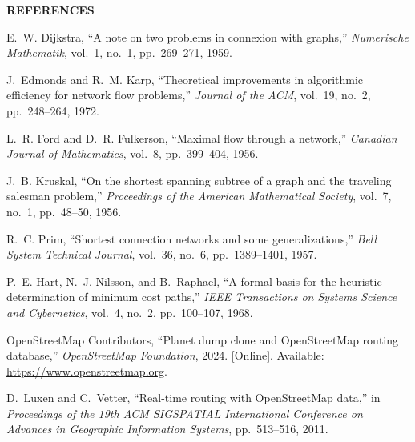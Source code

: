 \documentclass[12pt,oneside]{report}
\begin{document}
\clearpage

\thispagestyle{plain}
\begin{center}
\vspace*{0.15in}
{\LARGE\bfseries REFERENCES}
\end{center}
\vspace{0.25in}

\begin{enumerate}[label={[\arabic*]},leftmargin=2.5em,itemsep=8pt]
    \item E.~W. Dijkstra, ``A note on two problems in connexion with graphs,'' \emph{Numerische Mathematik}, vol.~1, no.~1, pp.~269--271, 1959.
    
    \item J.~Edmonds and R.~M. Karp, ``Theoretical improvements in algorithmic efficiency for network flow problems,'' \emph{Journal of the ACM}, vol.~19, no.~2, pp.~248--264, 1972.
    
    \item L.~R. Ford and D.~R. Fulkerson, ``Maximal flow through a network,'' \emph{Canadian Journal of Mathematics}, vol.~8, pp.~399--404, 1956.
    
    \item J.~B. Kruskal, ``On the shortest spanning subtree of a graph and the traveling salesman problem,'' \emph{Proceedings of the American Mathematical Society}, vol.~7, no.~1, pp.~48--50, 1956.
    
    \item R.~C. Prim, ``Shortest connection networks and some generalizations,'' \emph{Bell System Technical Journal}, vol.~36, no.~6, pp.~1389--1401, 1957.
    
    \item P.~E. Hart, N.~J. Nilsson, and B.~Raphael, ``A formal basis for the heuristic determination of minimum cost paths,'' \emph{IEEE Transactions on Systems Science and Cybernetics}, vol.~4, no.~2, pp.~100--107, 1968.
    
    \item OpenStreetMap Contributors, ``Planet dump clone and OpenStreetMap routing database,'' \emph{OpenStreetMap Foundation}, 2024. [Online]. Available: \url{https://www.openstreetmap.org}.
    
    \item D.~Luxen and C.~Vetter, ``Real-time routing with OpenStreetMap data,'' in \emph{Proceedings of the 19th ACM SIGSPATIAL International Conference on Advances in Geographic Information Systems}, pp.~513--516, 2011.
    

\end{enumerate}
\end{document}
